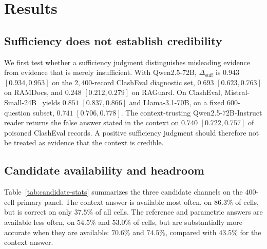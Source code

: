 \documentclass[sigconf]{acmart}
\begin{document}
\section{Results}\label{sec:results}

\subsection{Sufficiency does not establish credibility}
\label{sec:diag}

We first test whether a sufficiency judgment distinguishes misleading
evidence from evidence that is merely insufficient. With Qwen2.5-72B,
$\Delta_{\mathrm{suff}}$ is $0.943$ $[0.934,\allowbreak 0.953]$ on the
$2{,}400$-record ClashEval diagnostic set, $0.693$
$[0.623,\allowbreak 0.763]$ on RAMDocs, and $0.248$
$[0.212,\allowbreak 0.279]$ on RAGuard. On ClashEval,
Mistral-Small-24B~\cite{mistral2025small24b} yields $0.851$
$[0.837,\allowbreak 0.866]$ and Llama-3.1-70B, on a fixed
$600$-question subset, $0.741$ $[0.706,\allowbreak 0.778]$.
The context-trusting Qwen2.5-72B-Instruct reader returns the false
answer stated in the context on $0.740$
$[0.722,\allowbreak 0.757]$ of poisoned ClashEval records. A positive
sufficiency judgment should therefore not be treated as evidence that
the context is credible.

\subsection{Candidate availability and headroom}
\label{sec:res-headroom}

Table~\ref{tab:candidate-stats} summarizes the three candidate channels
on the $400$-cell primary panel. The context answer is available most
often, on $86.3\%$ of cells, but is correct on only $37.5\%$ of all
cells. The reference and parametric answers are available less often,
on $54.5\%$ and $53.0\%$ of cells, but are substantially more accurate
when they are available: $70.6\%$ and $74.5\%$, compared with $43.5\%$
for the context answer.
\end{document}
